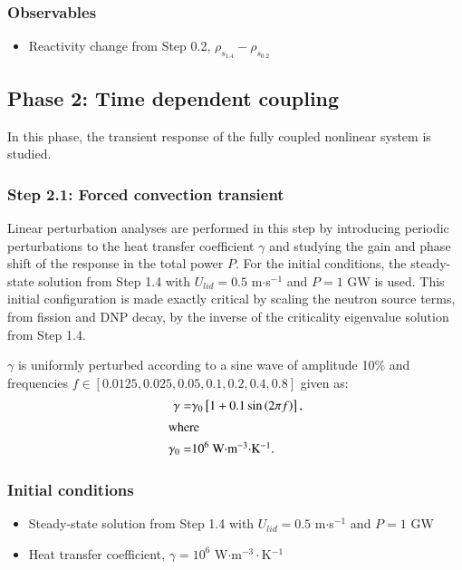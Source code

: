 \subsubsection*{Observables}
\begin{itemize}
    \item Reactivity change from Step 0.2, $\rho_{s_{1.4}} - \rho_{s_{0.2}}$
\end{itemize}

\subsection{Phase 2: Time dependent coupling}

In this phase, the transient response of the fully coupled nonlinear system is
studied.

\subsubsection{Step 2.1: Forced convection transient}

Linear perturbation analyses are performed in this step by introducing periodic
perturbations to the heat transfer coefficient $\gamma$ and studying the gain
and phase shift of the response in the total power $P$. For the initial
conditions, the steady-state solution from Step 1.4 with
$U_{lid} = 0.5$ m$\cdot$s$^{-1}$ and $P = 1$ GW is used. This initial
configuration is made exactly critical by scaling the neutron source terms,
from fission and \gls{DNP} decay, by the inverse of the criticality eigenvalue
solution from Step 1.4.

$\gamma$ is uniformly perturbed according to a sine wave of amplitude 10\% and
frequencies $f \in [0.0125, 0.025, 0.05, 0.1, 0.2, 0.4, 0.8]$ given as:
\begin{align}
    \gamma =& \gamma_0 \left[ 1 + 0.1\sin\left(2 \pi f \right) \right], \\
    \intertext{where}
    \gamma_0 =& 10^6 \mbox{ W$\cdot$m$^{-3}\cdot$K$^{-1}$}.
\end{align}

\subsubsection*{Initial conditions}
\begin{itemize}
    \item Steady-state solution from Step 1.4 with
    $U_{lid} = 0.5$ m$\cdot$s$^{-1}$ and $P = 1$ GW
    \item Heat transfer coefficient, $\gamma = 10^6$ W$\cdot$m$^{-3}\cdot$K$^{-1}$
\end{itemize}
%
